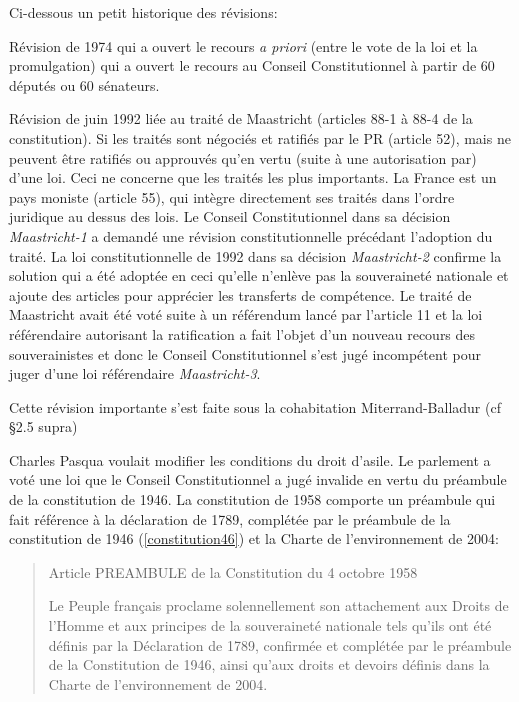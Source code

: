 \documentclass[math]{cours}
\begin{document}
Ci-dessous un petit historique des révisions:
\begin{description}
	\item Révision de 1974 qui a ouvert le recours \emph{a priori} (entre le vote de la loi et la promulgation) qui a ouvert le recours au Conseil Constitutionnel à partir de 60 députés ou 60 sénateurs.
	\item Révision de juin 1992 liée au traité de Maastricht (articles 88-1 à 88-4 de la constitution).
		Si les traités sont négociés et ratifiés par le PR (article 52), mais ne peuvent être ratifiés ou approuvés qu'en vertu (suite à une autorisation par) d'une loi. Ceci ne concerne que les traités les plus importants.
		La France est un pays moniste (article 55), qui intègre directement ses traités dans l'ordre juridique au dessus des lois.
		Le Conseil Constitutionnel dans sa décision \emph{Maastricht-1} a demandé une révision constitutionnelle précédant l'adoption du traité.
		La loi constitutionnelle de 1992 dans sa décision \emph{Maastricht-2} confirme la solution qui a été adoptée en ceci qu'elle n'enlève pas la souveraineté nationale et ajoute des articles pour apprécier les transferts de compétence.
		Le traité de Maastricht avait été voté suite à un référendum lancé par l'article 11 et la loi référendaire autorisant la ratification a fait l'objet d'un nouveau recours des souverainistes et donc le Conseil Constitutionnel s'est jugé incompétent pour juger d'une loi référendaire \emph{Maastricht-3}.
	\item[Révision de juillet 1993 sur le CSM et la Cour de justice de la République] Cette révision importante s'est faite sous la cohabitation Miterrand-Balladur (cf §2.5 supra)
	\item[Révision de novembre 1993 sur le droit d'asile (\emph{validation constitutionelle})]
		Charles Pasqua voulait modifier les conditions du droit d'asile.
		Le parlement a voté une loi que le Conseil Constitutionnel a jugé invalide en vertu du préambule de la constitution de 1946.
		La constitution de 1958 comporte un préambule qui fait référence à la déclaration de 1789, complétée par le préambule de la constitution de 1946 (\ref{constitution46}) et la Charte de l'environnement de 2004:
		\begin{quote}
			\begin{center}
				Article PREAMBULE de la Constitution du 4 octobre 1958
			\end{center}
			Le Peuple français proclame solennellement son attachement aux Droits de l'Homme et aux principes de la souveraineté nationale tels qu'ils ont été définis par la Déclaration de 1789, confirmée et complétée par le préambule de la Constitution de 1946, ainsi qu'aux droits et devoirs définis dans la Charte de l'environnement de 2004.


\end{quote}
\end{description}
\end{document}
